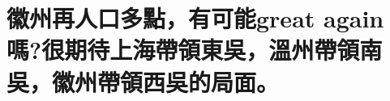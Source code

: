 %

\chapter[徽州再人口多點，有可能great again嗎?很期待上海帶領東吳，溫州帶領南吳，徽州帶領西吳的局面。]{徽州再人口多點，有可能great again嗎?很期待上海帶領東吳，溫州帶領南吳，徽州帶領西吳的局面。}

